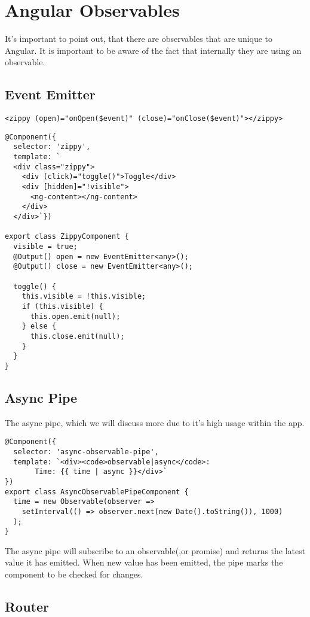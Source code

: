\chapter{ Angular Observables }
It's important to point out, that there are observables that are unique to 
Angular. It is important to be aware of the fact that internally they are 
using an observable. 

\section{ Event Emitter }

\begin{lstlisting}
<zippy (open)="onOpen($event)" (close)="onClose($event)"></zippy>
\end{lstlisting}

\begin{lstlisting}
@Component({
  selector: 'zippy',
  template: `
  <div class="zippy">
    <div (click)="toggle()">Toggle</div>
    <div [hidden]="!visible">
      <ng-content></ng-content>
    </div>
  </div>`})

export class ZippyComponent {
  visible = true;
  @Output() open = new EventEmitter<any>();
  @Output() close = new EventEmitter<any>();

  toggle() {
    this.visible = !this.visible;
    if (this.visible) {
      this.open.emit(null);
    } else {
      this.close.emit(null);
    }
  }
}
\end{lstlisting}

\section{ Async Pipe }
The async pipe, which we will discuss more due to it's high usage within the
app. 

\begin{lstlisting}
@Component({
  selector: 'async-observable-pipe',
  template: `<div><code>observable|async</code>:
       Time: {{ time | async }}</div>`
})
export class AsyncObservablePipeComponent {
  time = new Observable(observer =>
    setInterval(() => observer.next(new Date().toString()), 1000)
  );
}
\end{lstlisting}

The async pipe will subscribe to an observable(,or promise) and returns the 
latest value it has emitted. When new value has been emitted, the pipe marks 
the component to be checked for changes. 

\section{ Router }

